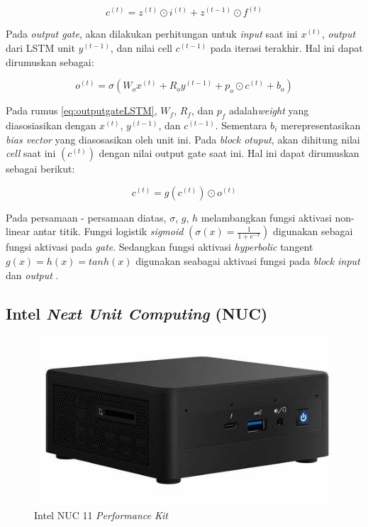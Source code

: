 \begin{equation}
    \label{eq:cellLSTM}
    c^{(t)} =  z^{(t)} \odot  i^{(t)} + z^{(t-1)} \odot  f^{(t)}
\end{equation}

Pada \textit{output gate}, akan dilakukan perhitungan untuk \textit{input} saat ini $x^{(t)}$, \textit{output} dari LSTM unit $y^{(t-1)}$, dan nilai cell $c^{(t-1)}$ pada iterasi terakhir. Hal ini dapat dirumuskan sebagai:

\begin{equation}
    \label{eq:outputgateLSTM}
    o^{(t)} = \sigma(W_o x^{(t)} + R_o y^{(t-1)}+ p_o \odot c^{(t)} + b_o)
\end{equation}

Pada rumus \ref{eq:outputgateLSTM}, $W_f$, $R_f$, dan $p_f$ adalah\textit{weight} yang diasosiasikan dengan $x^{(t)}$, $y^{(t-1)}$, dan $c^{(t-1)}$. Sementara $b_i$ merepresentasikan \textit{bias vector} yang diasosasikan oleh unit ini. Pada \textit{block otuput}, akan dihitung nilai \textit{cell} saat ini $(c^{(t)})$ dengan nilai output gate saat ini. Hal ini dapat dirumuskan sebagai berikut:

\begin{equation}
    \label{eq:blockoutputLSTM}
    c^{(t)} =  g(c^{(t)}) \odot o^{(t)}
\end{equation}

Pada persamaan - persamaan diatas, $\sigma$, $g$, $h$ melambangkan fungsi aktivasi non-linear antar titik. Fungsi logistik \textit{sigmoid} $(\sigma(x) = \frac{1}{1 + e^{-x}})$ digunakan sebagai fungsi aktivasi pada \textit{gate}. Sedangkan fungsi aktivasi \textit{hyperbolic} tangent $g(x) = h(x) = tanh(x)$ digunakan seabagai aktivasi fungsi pada \textit{block input} dan \textit{output} \parencite{van2020}.

\subsection{Intel \emph{Next Unit Computing} (NUC)}

\begin{figure}[H]
    \centering

    \includegraphics[scale=0.6]{gambar/bab2-nuc_11_performace_kit.jpeg}
 
    \caption{Intel NUC 11 \emph{Performance Kit}}
    \label{fig:jetsonnano}
\end{figure}


